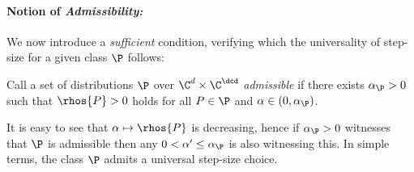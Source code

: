 \paragraph{Notion of \emph{Admissibility:}} We now introduce a \emph{sufficient} condition, verifying which the universality of step-size for a given class $\P$ follows:
\begin{definition}
Call a set of distributions $\P$ over $\C^{d}\times \C^{\dcd}$
\emph{admissible} if there exists $\alpha_{\P}>0$ such that
$\rhos{P}>0$ holds for all $P\in \P$ and $\alpha\in(0,\alpha_{\P})$.
\end{definition}
It is easy to see that $\alpha \mapsto \rhos{P}$ is decreasing,
hence if $\alpha_{\P}>0$ witnesses that $\P$ is admissible
then any $0<\alpha'\le \alpha_{\P}$ is also witnessing this. In simple terms, the class $\P$ admits a universal step-size choice. 


